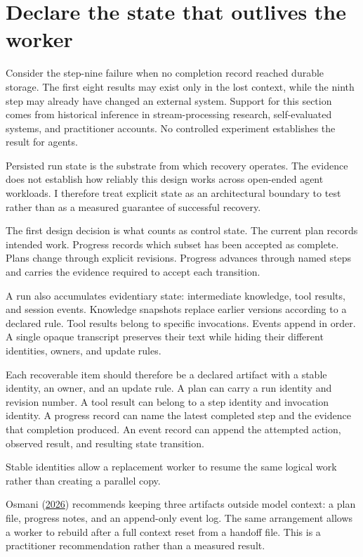 \section{Declare the state that outlives the worker}\label{declare-the-state-that-outlives-the-worker}

Consider the step-nine failure when no completion record reached durable storage. The first eight results may exist only in the lost context, while the ninth step may already have changed an external system. Support for this section comes from historical inference in stream-processing research, self-evaluated systems, and practitioner accounts. No controlled experiment establishes the result for agents.

Persisted run state is the substrate from which recovery operates. The evidence does not establish how reliably this design works across open-ended agent workloads. I therefore treat explicit state as an architectural boundary to test rather than as a measured guarantee of successful recovery.

The first design decision is what counts as control state. The current plan records intended work. Progress records which subset has been accepted as complete. Plans change through explicit revisions. Progress advances through named steps and carries the evidence required to accept each transition.

A run also accumulates evidentiary state: intermediate knowledge, tool results, and session events. Knowledge snapshots replace earlier versions according to a declared rule. Tool results belong to specific invocations. Events append in order. A single opaque transcript preserves their text while hiding their different identities, owners, and update rules.

Each recoverable item should therefore be a declared artifact with a stable identity, an owner, and an update rule. A plan can carry a run identity and revision number. A tool result can belong to a step identity and invocation identity. A progress record can name the latest completed step and the evidence that completion produced. An event record can append the attempted action, observed result, and resulting state transition.

Stable identities allow a replacement worker to resume the same logical work rather than creating a parallel copy.

Osmani (\href{https://addyo.substack.com/p/long-running-agents}{2026}) recommends keeping three artifacts outside model context: a plan file, progress notes, and an append-only event log. The same arrangement allows a worker to rebuild after a full context reset from a handoff file. This is a practitioner recommendation rather than a measured result.


